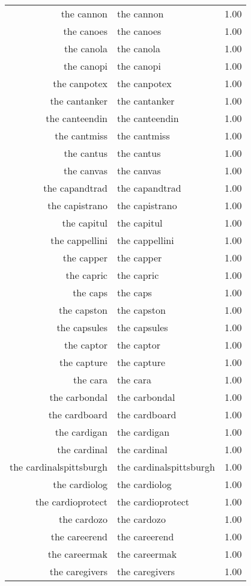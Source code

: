 \begin{table}[ht]
\begin{tabular}{rlr}
  the cannon & the cannon & 1.00 \\ 
  the canoes & the canoes & 1.00 \\ 
  the canola & the canola & 1.00 \\ 
  the canopi & the canopi & 1.00 \\ 
  the canpotex & the canpotex & 1.00 \\ 
  the cantanker & the cantanker & 1.00 \\ 
  the canteendin & the canteendin & 1.00 \\ 
  the cantmiss & the cantmiss & 1.00 \\ 
  the cantus & the cantus & 1.00 \\ 
  the canvas & the canvas & 1.00 \\ 
  the capandtrad & the capandtrad & 1.00 \\ 
  the capistrano & the capistrano & 1.00 \\ 
  the capitul & the capitul & 1.00 \\ 
  the cappellini & the cappellini & 1.00 \\ 
  the capper & the capper & 1.00 \\ 
  the capric & the capric & 1.00 \\ 
  the caps & the caps & 1.00 \\ 
  the capston & the capston & 1.00 \\ 
  the capsules & the capsules & 1.00 \\ 
  the captor & the captor & 1.00 \\ 
  the capture & the capture & 1.00 \\ 
  the cara & the cara & 1.00 \\ 
  the carbondal & the carbondal & 1.00 \\ 
  the cardboard & the cardboard & 1.00 \\ 
  the cardigan & the cardigan & 1.00 \\ 
  the cardinal & the cardinal & 1.00 \\ 
  the cardinalspittsburgh & the cardinalspittsburgh & 1.00 \\ 
  the cardiolog & the cardiolog & 1.00 \\ 
  the cardioprotect & the cardioprotect & 1.00 \\ 
  the cardozo & the cardozo & 1.00 \\ 
  the careerend & the careerend & 1.00 \\ 
  the careermak & the careermak & 1.00 \\ 
  the caregivers & the caregivers & 1.00 \\ 

\end{tabular}
\end{table}
